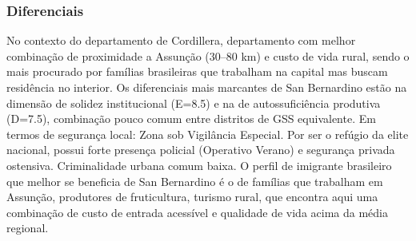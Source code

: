 \subsubsection*{Diferenciais}\label{dif-san-bernardino-0316}
No contexto do departamento de Cordillera, departamento com melhor combinação de proximidade a Assunção (30–80 km) e custo de vida rural, sendo o mais procurado por famílias brasileiras que trabalham na capital mas buscam residência no interior. Os diferenciais mais marcantes de San Bernardino estão na dimensão de solidez institucional (E=8.5) e na de autossuficiência produtiva (D=7.5), combinação pouco comum entre distritos de GSS equivalente. Em termos de segurança local: Zona sob Vigilância Especial. Por ser o refúgio da elite nacional, possui forte presença policial (Operativo Verano) e segurança privada ostensiva. Criminalidade urbana comum baixa. O perfil de imigrante brasileiro que melhor se beneficia de San Bernardino é o de famílias que trabalham em Assunção, produtores de fruticultura, turismo rural, que encontra aqui uma combinação de custo de entrada acessível e qualidade de vida acima da média regional.
